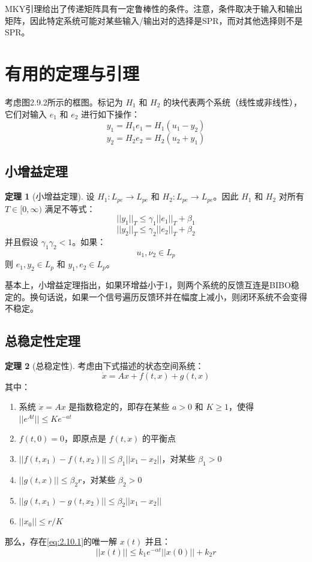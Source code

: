 \documentclass[UTF8,12pt,a4paper]{ctexart}
\theoremstyle{definition}
\newtheorem{theorem}{定理}[section]
\begin{document}
MKY引理给出了传递矩阵具有一定鲁棒性的条件。注意，条件取决于输入和输出矩阵，因此特定系统可能对某些输入/输出对的选择是SPR，而对其他选择则不是SPR。

\section{有用的定理与引理}

考虑图2.9.2所示的框图。标记为 $H_1$ 和 $H_2$ 的块代表两个系统（线性或非线性），它们对输入 $e_1$ 和 $e_2$ 进行如下操作：
\[
y_1 = H_1 e_1 = H_1(u_1 - y_2)
\]
\[
y_2 = H_2 e_2 = H_2(u_2 + y_1)
\]

\subsection{小增益定理}

\begin{theorem}[小增益定理]
设 $H_1: L_{pe} \rightarrow L_{pe}$ 和 $H_2: L_{pe} \rightarrow L_{pe}$。因此 $H_1$ 和 $H_2$ 对所有 $T \in [0, \infty)$ 满足不等式：
\[
||y_1||_T \leq \gamma_1 ||e_1||_T + \beta_1
\]
\[
||y_2||_T \leq \gamma_2 ||e_2||_T + \beta_2
\]
并且假设 $\gamma_1 \gamma_2 < 1$。如果：
\[
u_1, \nu_2 \in L_p\]
则 $e_1, y_2 \in L_p$ 和 $y_1, e_2 \in L_p$。
\end{theorem}

基本上，小增益定理指出，如果环增益小于1，则两个系统的反馈互连是BIBO稳定的。换句话说，如果一个信号遍历反馈环并在幅度上减小，则闭环系统不会变得不稳定。

\subsection{总稳定性定理}

\begin{theorem}[总稳定性]
考虑由下式描述的状态空间系统：
\[
\dot{x} = Ax + f(t, x) + g(t, x)
\]
其中：
\begin{enumerate}
\item 系统 $\dot{x} = Ax$ 是指数稳定的，即存在某些 $a > 0$ 和 $K \geq 1$，使得 $||e^{At}|| \leq Ke^{-at}$
\item $f(t, 0) = 0$，即原点是 $f(t, x)$ 的平衡点
\item $||f(t, x_1) - f(t, x_2)|| \leq \beta_1 ||x_1 - x_2||$，对某些 $\beta_1 > 0$
\item $||g(t, x)|| \leq \beta_2 r$，对某些 $\beta_2 > 0$
\item $||g(t, x_1) - g(t, x_2)|| \leq \beta_2 ||x_1 - x_2||$
\item $||x_0|| \leq r/K$
\end{enumerate}
那么，存在\eqref{eq:2.10.1}的唯一解 $x(t)$ 并且：
\[
||x(t)|| \leq k_1 e^{-\alpha t} ||x(0)|| + k_2 r
\]
\end{theorem}
\end{document}
